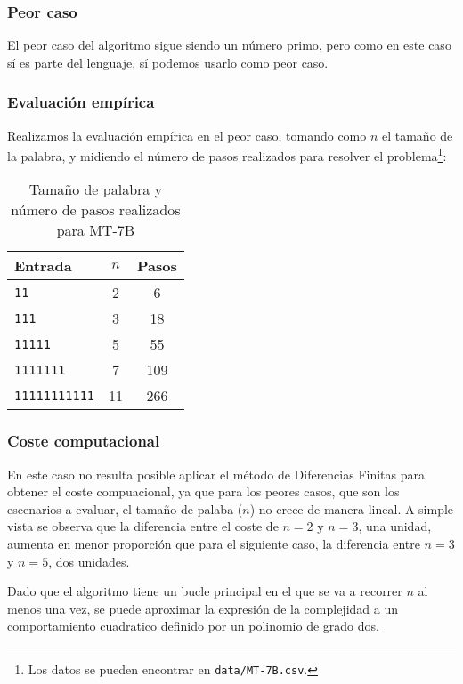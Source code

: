 

\subsubsection*{Peor caso}
El peor caso del algoritmo sigue siendo un número primo, pero como en este caso sí es parte del lenguaje, sí podemos usarlo como peor caso.


\subsubsection*{Evaluación empírica}
Realizamos la evaluación empírica en el peor caso, tomando como $n$ el tamaño de la palabra, y midiendo el número de pasos realizados para resolver el problema\footnote{Los datos se pueden encontrar en \texttt{data/MT-7B.csv}.}:

\begin{table}[h]
    \centering
    \begin{tabular}{lcc}
        Entrada & $n$ & Pasos \\
        \hline
        \texttt{11}            &  2  & 6   \\
        \texttt{111}           &  3  & 18  \\
        \texttt{11111}         &  5  & 55  \\
        \texttt{1111111}       &  7  & 109 \\
        \texttt{11111111111}   & 11  & 266 \\
    \end{tabular}
    \caption{Tamaño de palabra y número de pasos realizados para MT-7B}
\end{table}


\subsubsection*{Coste computacional}
En este caso no resulta posible aplicar el método de Diferencias Finitas para obtener el coste compuacional, ya que para los peores casos, que son los escenarios a evaluar, el tamaño de palaba ($n$) no crece de manera lineal. A simple vista se observa que la diferencia entre el coste de $n=2$ y $n=3$, una unidad, aumenta en menor proporción que para el siguiente caso, la diferencia entre $n=3$ y $n=5$, dos unidades.\medskip

Dado que el algoritmo tiene un bucle principal en el que se va a recorrer $n$ al menos una vez, se puede aproximar la expresión de la complejidad a un comportamiento cuadratico definido por un polinomio de grado dos.


